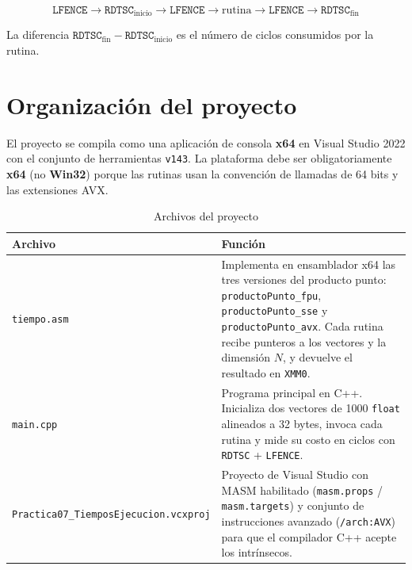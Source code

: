 \documentclass[12pt, letterpaper]{article}
\begin{document}
\begin{equation*}
    \texttt{LFENCE} \rightarrow \texttt{RDTSC}_{\text{inicio}} \rightarrow \texttt{LFENCE} \rightarrow \text{rutina} \rightarrow \texttt{LFENCE} \rightarrow \texttt{RDTSC}_{\text{fin}}
\end{equation*}

La diferencia $\texttt{RDTSC}_{\text{fin}} - \texttt{RDTSC}_{\text{inicio}}$ es el número de ciclos consumidos por la rutina.

\section{Organización del proyecto}

El proyecto se compila como una aplicación de consola \textbf{x64} en Visual Studio 2022 con el conjunto de herramientas \texttt{v143}. La plataforma debe ser obligatoriamente \textbf{x64} (no \textbf{Win32}) porque las rutinas usan la convención de llamadas de 64 bits y las extensiones AVX.

\begin{table}[H]
    \centering
    \begin{tabular}{@{}lp{9cm}@{}}
        \toprule
        \textbf{Archivo} & \textbf{Función} \\
        \midrule
        \texttt{tiempo.asm} & Implementa en ensamblador x64 las tres versiones del producto punto: \texttt{productoPunto\_fpu}, \texttt{productoPunto\_sse} y \texttt{productoPunto\_avx}. Cada rutina recibe punteros a los vectores y la dimensión $N$, y devuelve el resultado en \texttt{XMM0}. \\
        \midrule
        \texttt{main.cpp} & Programa principal en C++. Inicializa dos vectores de 1000 \texttt{float} alineados a 32 bytes, invoca cada rutina y mide su costo en ciclos con \texttt{RDTSC} + \texttt{LFENCE}. \\
        \midrule
        \texttt{Practica07\_TiemposEjecucion.vcxproj} & Proyecto de Visual Studio con MASM habilitado (\texttt{masm.props} / \texttt{masm.targets}) y conjunto de instrucciones avanzado (\texttt{/arch:AVX}) para que el compilador C++ acepte los intrínsecos. \\
        \bottomrule
    \end{tabular}
    \caption{Archivos del proyecto}
\end{table}
\end{document}
